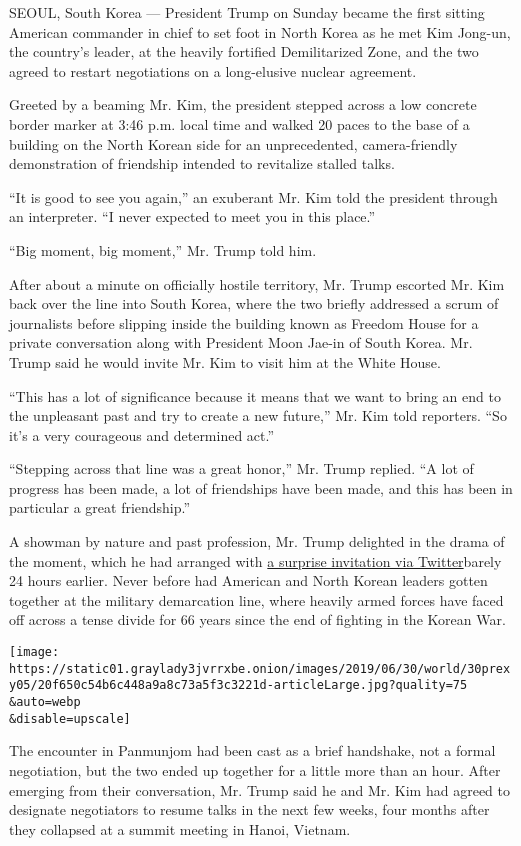 SEOUL, South Korea --- President Trump on Sunday became the first
sitting American commander in chief to set foot in North Korea as he met
Kim Jong-un, the country's leader, at the heavily fortified
Demilitarized Zone, and the two agreed to restart negotiations on a
long-elusive nuclear agreement.

Greeted by a beaming Mr. Kim, the president stepped across a low
concrete border marker at 3:46 p.m. local time and walked 20 paces to
the base of a building on the North Korean side for an unprecedented,
camera-friendly demonstration of friendship intended to revitalize
stalled talks.

``It is good to see you again,'' an exuberant Mr. Kim told the president
through an interpreter. ``I never expected to meet you in this place.''

``Big moment, big moment,'' Mr. Trump told him.

After about a minute on officially hostile territory, Mr. Trump escorted
Mr. Kim back over the line into South Korea, where the two briefly
addressed a scrum of journalists before slipping inside the building
known as Freedom House for a private conversation along with President
Moon Jae-in of South Korea. Mr. Trump said he would invite Mr. Kim to
visit him at the White House.

``This has a lot of significance because it means that we want to bring
an end to the unpleasant past and try to create a new future,'' Mr. Kim
told reporters. ``So it's a very courageous and determined act.''

``Stepping across that line was a great honor,'' Mr. Trump replied. ``A
lot of progress has been made, a lot of friendships have been made, and
this has been in particular a great friendship.''

A showman by nature and past profession, Mr. Trump delighted in the
drama of the moment, which he had arranged with
\href{https://www.nytimes3xbfgragh.onion/2019/06/29/world/asia/trump-kim-dmz.html}{a
surprise invitation via Twitter}barely 24 hours earlier. Never before
had American and North Korean leaders gotten together at the military
demarcation line, where heavily armed forces have faced off across a
tense divide for 66 years since the end of fighting in the Korean War.

\texttt{[image: https://static01.graylady3jvrrxbe.onion/images/2019/06/30/world/30prexy05/20f650c54b6c448a9a8c73a5f3c3221d-articleLarge.jpg?quality=75\\\&auto=webp\\\&disable=upscale]}

The encounter in Panmunjom had been cast as a brief handshake, not a
formal negotiation, but the two ended up together for a little more than
an hour. After emerging from their conversation, Mr. Trump said he and
Mr. Kim had agreed to designate negotiators to resume talks in the next
few weeks, four months after they collapsed at a summit meeting in
Hanoi, Vietnam.

